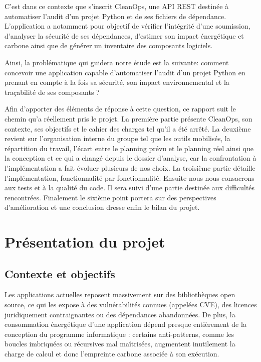 \documentclass[a4paper,12pt]{article}
\begin{document}
C'est dans ce contexte que s'inscrit CleanOps, une API REST destinée à
automatiser l'audit d'un projet Python et de ses fichiers de dépendance.
L'application a notamment pour objectif de vérifier l'intégrité d'une
soumission, d'analyser la sécurité de ses dépendances, d'estimer son
impact énergétique et carbone ainsi que de générer un inventaire des
composants logiciels.

Ainsi, la problématique qui guidera notre étude est la suivante: comment
concevoir une application capable d'automatiser l'audit d'un projet
Python en prenant en compte à la fois sa sécurité, son impact
environnemental et la traçabilité de ses composants ?

Afin d'apporter des éléments de réponse à cette question, ce rapport
suit le chemin qu'a réellement pris le projet. La première partie
présente CleanOps, son contexte, ses objectifs et le cahier des charges
tel qu'il a été arrêté. La deuxième revient sur l'organisation interne
du groupe tel que les outils mobilisés, la répartition du travail,
l'écart entre le planning prévu et le planning réel ainsi que la
conception et ce qui a changé depuis le dossier d'analyse, car la
confrontation à l'implémentation a fait évoluer plusieurs de nos choix.
La troisième partie détaille l'implémentation, fonctionnalité par
fonctionnalité. Ensuite nous nous consacrons aux tests et à la qualité
du code. Il sera suivi d'une partie destinée aux difficultés
rencontrées. Finalement le sixième point portera sur des perspectives
d'amélioration et une conclusion dresse enfin le bilan du projet.

\newpage{}

\section{Présentation du projet}\label{pruxe9sentation-du-projet}

\subsection{Contexte et objectifs}\label{contexte-et-objectifs}

Les applications actuelles reposent massivement sur des bibliothèques
open source, ce qui les expose à des vulnérabilités connues (appelées
CVE), des licences juridiquement contraignantes ou des dépendances
abandonnées. De plus, la consommation énergétique d'une application
dépend presque entièrement de la conception du programme informatique :
certains anti-patterns, comme les boucles imbriquées ou récursives mal
maîtrisées, augmentent inutilement la charge de calcul et donc
l'empreinte carbone associée à son exécution. \vspace{0.2cm}
\end{document}
